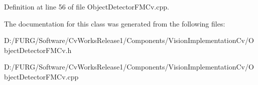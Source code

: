 Definition at line 56 of file Object\+Detector\+F\+M\+Cv.\+cpp.



The documentation for this class was generated from the following files\+:\begin{DoxyCompactItemize}
\item 
D\+:/\+F\+U\+R\+G/\+Software/\+Cv\+Works\+Release1/\+Components/\+Vision\+Implementation\+Cv/Object\+Detector\+F\+M\+Cv.\+h\item 
D\+:/\+F\+U\+R\+G/\+Software/\+Cv\+Works\+Release1/\+Components/\+Vision\+Implementation\+Cv/Object\+Detector\+F\+M\+Cv.\+cpp\end{DoxyCompactItemize}
